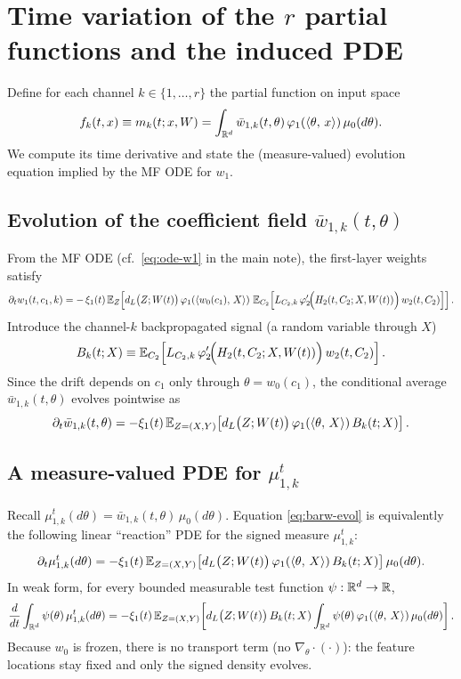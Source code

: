 \section{Time variation of the $r$ partial functions and the induced PDE}
\provedflag

Define for each channel $k\in\{1,\dots,r\}$ the partial function on input space
\[
f_k(t,x)\equiv m_k(t;x,W)=\int_{\mathbb{R}^d}\bar w_{1,k}(t,\theta)\,\varphi_1(\left\langle \theta,\,x \right\rangle)\,\mu_0(d\theta).
\]
We compute its time derivative and state the (measure-valued) evolution equation implied by the MF ODE for $w_1$.

\subsection{Evolution of the coefficient field $\bar w_{1,k}(t,\theta)$}

From the MF ODE (cf.\ \eqref{eq:ode-w1} in the main note), the first-layer weights satisfy
\[
\partial_t w_1(t,c_1,k)= -\,\xi_1(t)\,\mathbb{E}_{Z}\!\left[d_L\big(Z;W(t)\big)\,\varphi_1\!\left(\left\langle w_0(c_1),\,X \right\rangle\right)\,
\mathbb{E}_{C_2}\!\left[L_{C_2,k}\,\varphi_2'\!\Big(H_2(t,C_2;X,W(t))\Big)\,w_2(t,C_2)\right]\right].
\]
Introduce the channel-$k$ backpropagated signal (a random variable through $X$)
\[
B_k(t;X)\equiv \mathbb{E}_{C_2}\!\left[L_{C_2,k}\,\varphi_2'\!\Big(H_2(t,C_2;X,W(t))\Big)\,w_2(t,C_2)\right].
\]
Since the drift depends on $c_1$ only through $\theta=w_0(c_1)$, the conditional average $\bar w_{1,k}(t,\theta)$ evolves pointwise as
\begin{equation}\label{eq:barw-evol}
\partial_t \bar w_{1,k}(t,\theta)
=-\xi_1(t)\,\mathbb{E}_{Z=(X,Y)}\!\left[d_L\big(Z;W(t)\big)\,\varphi_1(\left\langle \theta,\,X \right\rangle)\,B_k(t;X)\right].
\end{equation}

\subsection{A measure-valued PDE for $\mu_{1,k}^t$}

Recall $\mu_{1,k}^t(d\theta)=\bar w_{1,k}(t,\theta)\,\mu_0(d\theta)$.
Equation \eqref{eq:barw-evol} is equivalently the following linear ``reaction'' PDE for the signed measure $\mu_{1,k}^t$:
\begin{equation}\label{eq:mu-reaction}
\partial_t \mu_{1,k}^t(d\theta)
=-\xi_1(t)\,\mathbb{E}_{Z=(X,Y)}\!\left[d_L\big(Z;W(t)\big)\,\varphi_1(\left\langle \theta,\,X \right\rangle)\,B_k(t;X)\right]\mu_0(d\theta).
\end{equation}
In weak form, for every bounded measurable test function $\psi:\mathbb{R}^d\to\mathbb{R}$,
\[
\frac{d}{dt}\int_{\mathbb{R}^d}\psi(\theta)\,\mu_{1,k}^t(d\theta)
=-\xi_1(t)\,\mathbb{E}_{Z=(X,Y)}\!\left[d_L\big(Z;W(t)\big)\,B_k(t;X)\int_{\mathbb{R}^d}\psi(\theta)\,\varphi_1(\left\langle \theta,\,X \right\rangle)\,\mu_0(d\theta)\right].
\]
Because $w_0$ is frozen, there is no transport term (no $\nabla_\theta\cdot(\cdot)$): the feature locations stay fixed and only the signed density evolves.

